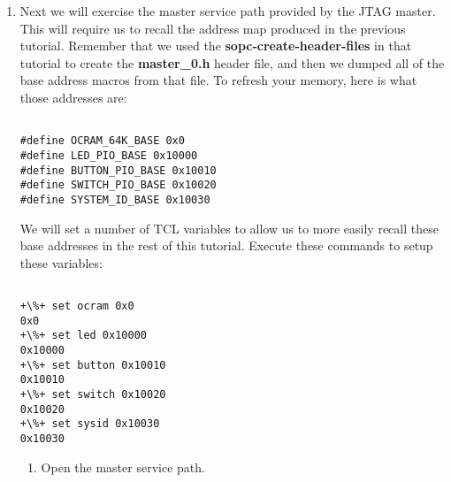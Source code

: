 \begin{flushleft}
\begin{enumerate}[
	label=\textbf{Step \arabic*.},
	leftmargin=*,
	widest={00},
	align=left]
\begin{enumerate}[
	label=\textbf{Step \arabic{enumi}\alph*.},
	leftmargin=*,
	align=left]
\begin{verbatim}

# first sample with KEY0 not pressed
+\%+ jtag_debug_sample_reset +\$+jb_path
1
# second sample with KEY0 pressed
+\%+ jtag_debug_sample_reset +\$+jb_path
0
# third sample with KEY0 not pressed
+\%+ jtag_debug_sample_reset +\$+jb_path
1

\end{verbatim}

\end{enumerate}

\item Next we will exercise the master service path provided by the JTAG master.  This will require us to recall the address map produced in the previous  tutorial.  Remember that we used the \textbf{sopc-\allowbreak create-\allowbreak header-\allowbreak files} in that tutorial to create the \textbf{master\_0.h} header file, and then we dumped all of the base address macros from that file.  To refresh your memory, here is what those addresses are:

\begin{verbatim}

#define OCRAM_64K_BASE 0x0
#define LED_PIO_BASE 0x10000
#define BUTTON_PIO_BASE 0x10010
#define SWITCH_PIO_BASE 0x10020
#define SYSTEM_ID_BASE 0x10030

\end{verbatim}

We will set a number of TCL variables to allow us to more easily recall these base addresses in the rest of this tutorial.  Execute these commands to setup these variables:

\begin{verbatim}

+\%+ set ocram 0x0
0x0
+\%+ set led 0x10000
0x10000
+\%+ set button 0x10010
0x10010
+\%+ set switch 0x10020
0x10020
+\%+ set sysid 0x10030
0x10030

\end{verbatim}

\begin{enumerate}[
	label=\textbf{Step \arabic{enumi}\alph*.},
	leftmargin=*,
	align=left]

\item Open the master service path.

\begin{verbatim}


\end{verbatim}
\end{enumerate}
\end{enumerate}
\end{flushleft}
